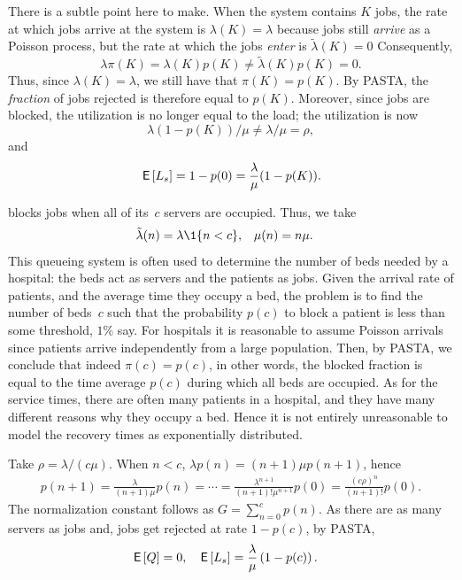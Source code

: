 \documentclass[queueing-book.tex]{subfiles}
\begin{document}
There is a subtle point here to make.
When the system contains $K$ jobs, the rate at which jobs arrive at the system is $\lambda (K) = \lambda$ because jobs still \emph{arrive} as a Poisson process, but the rate at which the jobs \emph{enter} is $\tilde \lambda(K)= 0$ Consequently,
\begin{equation*}
\lambda \pi(K) = \lambda(K) p(K) \neq \tilde \lambda(K) p(K) = 0.
\end{equation*}
Thus, since $\lambda(K) = \lambda$,  we still have that $\pi(K) = p(K)$. By PASTA, the \emph{fraction} of jobs rejected is therefore equal to $p(K)$.
Moreover, since jobs are blocked, the utilization is no longer equal to the load; the utilization is now
\begin{equation*}
\lambda (1-p(K))/\mu \neq \lambda /\mu = \rho,
\end{equation*}
and
\begin{equation}\label{eq:mm1-2}
\,\mathsf{E}\left[L_s\right] = 1-p(0) = \frac{\lambda}{\mu} (1-p(K)).
\end{equation}

 blocks jobs when all of its~$c$ servers are occupied.
Thus, we take
\begin{align*}
\tilde \lambda(n) &= \lambda\1{n<c}, & \mu(n) &= n \mu.
 \end{align*}
This queueing system is often used to determine the number of beds needed by a hospital: the beds act as servers and the patients as jobs.
Given the arrival rate of patients, and the average time they occupy a bed, the problem is to find the number of beds~$c$ such that the probability $p(c)$ to block a patient is less than some threshold, $1\%$ say.
For hospitals it is reasonable to assume Poisson arrivals since patients arrive independently from a large population.
Then, by PASTA, we conclude that indeed $\pi(c) = p(c)$, in other words, the blocked fraction is equal to the time average $p(c)$ during which all beds are occupied.
As for the service times, there are often many patients in a hospital, and they have many different reasons why they occupy a bed.
Hence it is not entirely unreasonable to model the recovery times as exponentially distributed.

Take $\rho = \lambda/(c \mu)$. When $n<c$, $\lambda p(n) = (n+1)\mu p(n+1)$, hence
 \begin{align*}
   p(n+1) = \frac{\lambda}{(n+1)\mu }p(n) = \cdots = \frac{\lambda^{n+1}}{(n+1)!\mu^{n+1}} p(0) = \frac{(c\rho)^{n}}{(n+1)!} p(0).
\end{align*}
The normalization constant follows  as $G = \sum_{n=0}^{c}p(n)$. As there are as many servers as jobs and, jobs get rejected at rate $1-p(c)$, by PASTA,
 \begin{align*}
   \,\mathsf{E}\left[Q\right] &= 0, & \,\mathsf{E}\left[L_s\right] &= \frac{\lambda}{\mu} \left(1- p(c)\right).
\end{align*}
\end{document}
